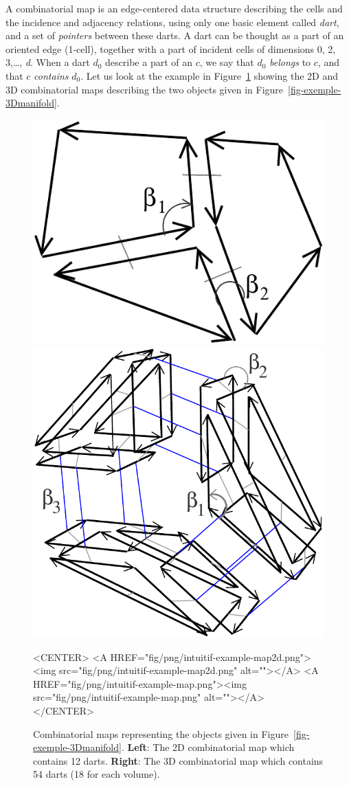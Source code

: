 A combinatorial map is an edge-centered data structure describing the
cells and the incidence and adjacency relations, using only one basic
element called \emph{dart}, and a set of \emph{pointers} between these
darts.  A dart can be thought as a part of an oriented edge (1-cell),
together with a part of incident cells of dimensions 0, 2, 3,\ldots,
\emph{d}. When a dart $d_0$ describe a part of an  $c$, we say that
$d_0$ \emph{belongs} to $c$, and that $c$ \emph{contains} $d_0$.  Let
us look at the example in Figure~\ref{fig-exemple-combi-maps} showing
the 2D and 3D combinatorial maps describing the two objects given in
Figure~\ref{fig-exemple-3Dmanifold}.
\begin{figure}[ht]
  \begin{ccTexOnly}
    \begin{center}
      \includegraphics[width=.3\textwidth]
      {Combinatorial_map/fig/pdf/intuitif-example-map2d}
      \qquad
      \includegraphics[width=.4\textwidth]
      {Combinatorial_map/fig/pdf/intuitif-example-map}
    \end{center}
  \end{ccTexOnly}
  \begin{ccHtmlOnly}
    <CENTER>
    <A HREF="fig/png/intuitif-example-map2d.png"><img src="fig/png/intuitif-example-map2d.png" alt=""></A>
    <A HREF="fig/png/intuitif-example-map.png"><img src="fig/png/intuitif-example-map.png" alt=""></A>
    </CENTER>
    \end{ccHtmlOnly}
    \caption{Combinatorial maps representing the objects given in 
      Figure~\ref{fig-exemple-3Dmanifold}.
      \textbf{Left}: The 2D combinatorial map which contains 12 darts.
      \textbf{Right}: The 3D combinatorial map which contains 54 darts
      (18 for each volume).
    }
    \label{fig-exemple-combi-maps}
\end{figure}

